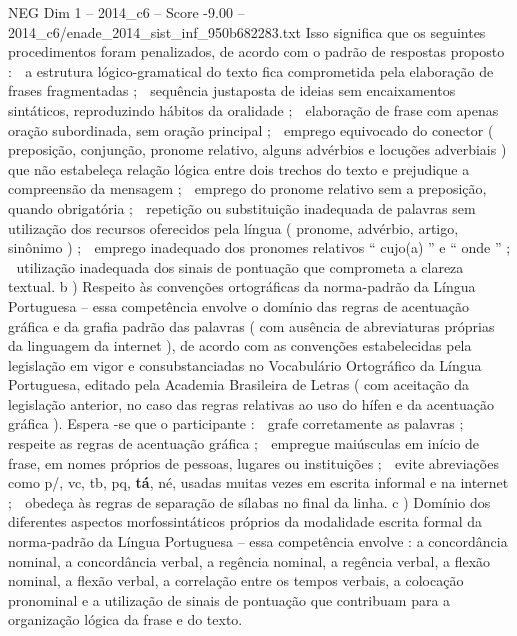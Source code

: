 \begin{textsample}{NEG Dim 1 – 2014\_c6 – Score -9.00 – 2014\_c6/enade\_2014\_sist\_inf\_950b682283.txt}
Isso significa que os seguintes procedimentos foram penalizados, de acordo com o padrão de respostas proposto :  a estrutura lógico-gramatical do texto fica comprometida pela elaboração de frases fragmentadas ;  sequência justaposta de ideias sem encaixamentos sintáticos, reproduzindo hábitos da oralidade ;  elaboração de frase com apenas oração subordinada, sem oração principal ;  emprego equivocado do conector ( preposição, conjunção, pronome relativo, alguns advérbios e locuções adverbiais ) que não estabeleça relação lógica entre dois trechos do texto e prejudique a compreensão da mensagem ;  emprego do pronome relativo sem a preposição, quando obrigatória ;  repetição ou substituição inadequada de palavras sem utilização dos recursos oferecidos pela língua ( pronome, advérbio, artigo, sinônimo ) ;  emprego inadequado dos pronomes relativos “ cujo(a) ” e “ onde ” ;  utilização inadequada dos sinais de pontuação que comprometa a clareza textual. b ) Respeito às convenções ortográficas da norma-padrão da Língua Portuguesa – essa competência envolve o domínio das regras de acentuação gráfica e da grafia padrão das palavras ( com ausência de abreviaturas próprias da linguagem da internet ), de acordo com as convenções estabelecidas pela legislação em vigor e consubstanciadas no Vocabulário Ortográfico da Língua Portuguesa, editado pela Academia Brasileira de Letras ( com aceitação da legislação anterior, no caso das regras relativas ao uso do hífen e da acentuação gráfica ).
Espera -se que o participante :  grafe corretamente as palavras ;  respeite as regras de acentuação gráfica ;  empregue maiúsculas em início de frase, em nomes próprios de pessoas, lugares ou instituições ;  evite abreviações como p/, vc, tb, pq, \textbf{tá}, né, usadas muitas vezes em escrita informal e na internet ;  obedeça às regras de separação de sílabas no final da linha. c ) Domínio dos diferentes aspectos morfossintáticos próprios da modalidade escrita formal da norma-padrão da Língua Portuguesa – essa competência envolve : a concordância nominal, a concordância verbal, a regência nominal, a regência verbal, a flexão nominal, a flexão verbal, a correlação entre os tempos verbais, a colocação pronominal e a utilização de sinais de pontuação que contribuam para a organização lógica da frase e do texto.

\end{textsample}

